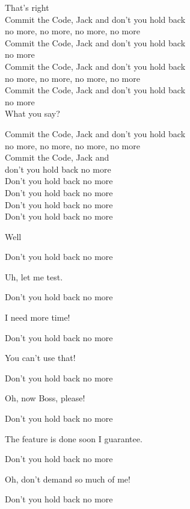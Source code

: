 \documentclass[11pt,a5paper]{article}
\begin{document}
				That’s right \\
				Commit the Code, Jack and don’t you hold back \\
				no more, no more, no more, no more \\
				Commit the Code, Jack and don’t you hold back \\ no more \\
				Commit the Code, Jack and don’t you hold back \\
				no more, no more, no more, no more \\
				Commit the Code, Jack and don’t you hold back \\ no more \\
				
				\hfill What you say?

				Commit the Code, Jack and don’t you hold back \\
				no more, no more, no more, no more \\
				Commit the Code, Jack and \\ don’t you hold back no more \\
				Don’t you hold back no more \\
				Don’t you hold back no more \\
				Don’t you hold back no more \\
				Don’t you hold back no more
				
				\hfill Well
				
				Don’t you hold back no more
				
				\hfill Uh, let me test.
				
				Don’t you hold back no more
				
				\hfill I need more time!
				
				Don’t you hold back no more
				
				\hfill You can’t use that!
				
				Don’t you hold back no more
				
				\hfill Oh, now Boss, please!
				
				Don’t you hold back no more
				
				\hfill The feature is done soon I guarantee.
				
				Don’t you hold back no more
				
				\hfill Oh, don’t demand so much of me!
				
				Don’t you hold back no more
				\pagebreak
\end{document}
